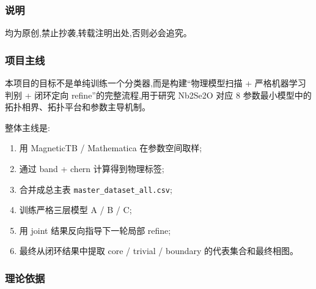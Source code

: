 \documentclass[lang=cn,scheme=chinese,color=blue,device=normal,toc=onecol,math=cm]{elegantbook}
\begin{document}
\subsubsection{说明}


均为原创,禁止抄袭,转载注明出处,否则必会追究。\par


\subsubsection{项目主线}


本项目的目标不是单纯训练一个分类器,而是构建“物理模型扫描 + 严格机器学习判别 + 闭环定向 refine”的完整流程,用于研究 Nb2Se2O 对应 8 参数最小模型中的拓扑相界、拓扑平台和参数主导机制。\par


整体主线是:\par


\begin{enumerate}
\item 用 MagneticTB /\allowbreak{} Mathematica 在参数空间取样;
\item 通过 band + chern 计算得到物理标签;
\item 合并成总主表 \texttt{master\_\allowbreak{}dataset\_\allowbreak{}all.csv};
\item 训练严格三层模型 A /\allowbreak{} B /\allowbreak{} C;
\item 用 joint 结果反向指导下一轮局部 refine;
\item 最终从闭环结果中提取 core /\allowbreak{} trivial /\allowbreak{} boundary 的代表集合和最终相图。
\end{enumerate}


\subsubsection{理论依据}
\end{document}

